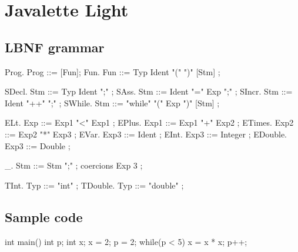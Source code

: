 \documentclass[a4paper,12pt,twosided]{report}
\begin{document}
%
%
\appendix
\chapter{Javalette Light}

\section{LBNF grammar}
\begin{code}
Prog.     Prog     ::= [Fun];
Fun.      Fun      ::= Typ Ident "(" ")"  [Stm] ;

SDecl.    Stm      ::= Typ Ident ";"  ;
SAss.     Stm      ::= Ident "=" Exp ";"  ;
SIncr.    Stm      ::= Ident "++" ";"  ;
SWhile.   Stm      ::= "while" "(" Exp ")" [Stm]  ;

ELt.      Exp      ::= Exp1 "<" Exp1 ;
EPlus.    Exp1     ::= Exp1 "+" Exp2 ;
ETimes.   Exp2     ::= Exp2 "*" Exp3 ;
EVar.     Exp3     ::= Ident ;
EInt.     Exp3     ::= Integer ;
EDouble.  Exp3     ::= Double ;

_.        Stm      ::= Stm ";" ;
coercions Exp 3 ;

TInt.     Typ  ::= "int" ;
TDouble.  Typ  ::= "double" ;
\end{code}

\newpage
\section{Sample code}
\begin{code}
int main() {
    int p;
    int x;
    x = 2;
    p = 2;
    while(p < 5) {
        x = x * x;
        p++;
    }
}
\end{code}

%
%




%
%
\end{document}
